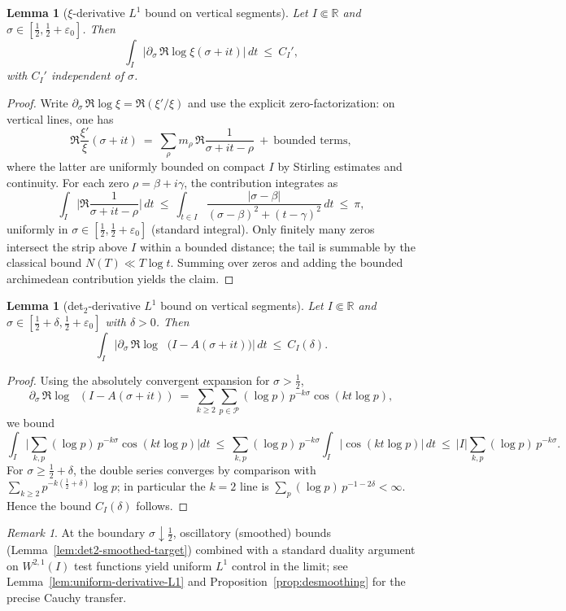 \documentclass[11pt]{article}
\newtheorem{lemma}[theorem]{Lemma}
\theoremstyle{definition}
\theoremstyle{remark}
\newtheorem{remark}[theorem]{Remark}
\newcommand{\R}{\mathbb{R}}
\newcommand{\PP}{\mathcal{P}}
\DeclareMathOperator{\dettwo}{det_2}
\begin{document}
\begin{lemma}[\(\xi\)-derivative $L^1$ bound on vertical segments]\label{lem:xi-deriv-L1}
Let $I\Subset\R$ and $\sigma\in[\tfrac12,\tfrac12+\varepsilon_0]$. Then
\[
 \int_I \Big|\partial_\sigma\,\Re\log\xi(\sigma+it)\Big|\,dt\ \le\ C_I',
\]
with $C_I'$ independent of $\sigma$.
\end{lemma}
\begin{proof}
Write \(\partial_\sigma\,\Re\log\xi=\Re(\xi'/\xi)\) and use the explicit zero-factorization: on vertical lines, one has
\[
 \Re\frac{\xi'}{\xi}(\sigma+it)\ =\ \sum_{\rho} m_\rho\,\Re\frac{1}{\sigma+it-\rho}\ +\ \text{bounded terms},
\]
where the latter are uniformly bounded on compact $I$ by Stirling estimates and continuity. For each zero \(\rho=\beta+i\gamma\), the contribution integrates as
\[\int_I \Big|\Re\frac{1}{\sigma+it-\rho}\Big|\,dt\ \le\ \int_{t\in I} \frac{|\sigma-\beta|}{(\sigma-\beta)^2+(t-\gamma)^2}\,dt\ \le\ \pi,
\]
uniformly in \(\sigma\in[\tfrac12,\tfrac12+\varepsilon_0]\) (standard integral). Only finitely many zeros intersect the strip above $I$ within a bounded distance; the tail is summable by the classical bound $N(T)\ll T\log t$. Summing over zeros and adding the bounded archimedean contribution yields the claim.
\end{proof}
\begin{lemma}[det$_2$-derivative $L^1$ bound on vertical segments]\label{lem:det2-deriv-L1}
Let $I\Subset\R$ and $\sigma\in[\tfrac12+\delta,\tfrac12+\varepsilon_0]$ with $\delta>0$. Then
\[
 \int_I \Big|\partial_\sigma\,\Re\log\dettwo\big(I-A(\sigma+it)\big)\Big|\,dt\ \le\ C_I(\delta).
\]
\end{lemma}
\begin{proof}
Using the absolutely convergent expansion for \(\sigma>\tfrac12\),
\[\partial_\sigma\,\Re\log\dettwo(I-A(\sigma+it))\ =\ \sum_{k\ge 2}\sum_{p\in\PP} (\log p)\,p^{-k\sigma}\cos(k t\log p),\]
we bound
\[\int_I \Big|\sum_{k,p}(\log p)\,p^{-k\sigma}\cos(k t\log p)\Big|dt\ \le\ \sum_{k,p}(\log p)\,p^{-k\sigma}\int_I |\cos(k t\log p)|\,dt\ \le\ |I|\sum_{k,p}(\log p)\,p^{-k\sigma}.
\]
For \(\sigma\ge \tfrac12+\delta\), the double series converges by comparison with \(\sum_{k\ge 2} p^{-k(\tfrac12+\delta)}\log p\); in particular the $k=2$ line is \(\sum_p (\log p)\,p^{-1-2\delta}<\infty\). Hence the bound $C_I(\delta)$ follows.
\end{proof}
\begin{remark}
At the boundary \(\sigma\downarrow \tfrac12\), oscillatory (smoothed) bounds (Lemma~\ref{lem:det2-smoothed-target}) combined with a standard duality argument on \(W^{2,1}(I)\) test functions yield uniform \(L^1\) control in the limit; see Lemma~\ref{lem:uniform-derivative-L1} and Proposition~\ref{prop:desmoothing} for the precise Cauchy transfer.
\end{remark}
\end{document}
